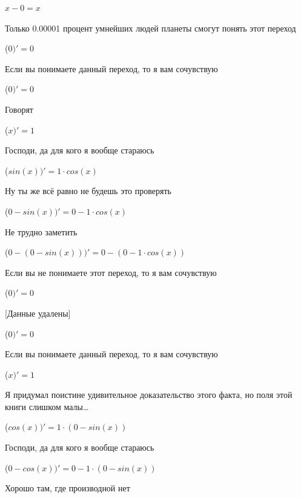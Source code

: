 \documentclass[12pt,a4paper,fleqn]{article}
\begin{document}
\begin{center}
$x-0 = x$\end{center}
Только 0.00001 процент умнейших людей планеты смогут понять этот переход

\begin{center}
 ($0)'
  = 0$\end{center}
Если вы понимаете данный переход, то я вам сочувствую

\begin{center}
 ($0)'
  = 0$\end{center}
Говорят

\begin{center}
 ($x)'
  = 1$\end{center}
Господи, да для кого я вообще стараюсь

\begin{center}
 ($sin(x))'
  = 1 \cdot cos(x)$\end{center}
Ну ты же всё равно не будешь это проверять

\begin{center}
 ($0-sin(x))'
  = 0-1 \cdot cos(x)$\end{center}
Не трудно заметить

\begin{center}
 ($0-(0-sin(x)))'
  = 0-(0-1 \cdot cos(x))$\end{center}
Если вы не понимаете этот переход, то я вам сочувствую

\begin{center}
 ($0)'
  = 0$\end{center}
[Данные удалены]

\begin{center}
 ($0)'
  = 0$\end{center}
Если вы понимаете данный переход, то я вам сочувствую

\begin{center}
 ($x)'
  = 1$\end{center}
Я придумал поистине удивительное доказательство этого факта, но поля этой книги слишком малы\ldots

\begin{center}
 ($cos(x))'
  = 1 \cdot (0-sin(x))$\end{center}
Господи, да для кого я вообще стараюсь

\begin{center}
 ($0-cos(x))'
  = 0-1 \cdot (0-sin(x))$\end{center}
Хорошо там, где производной нет\cite{link2}
\end{document}
